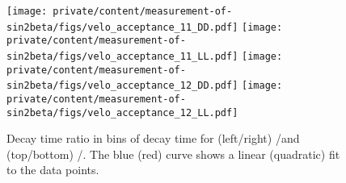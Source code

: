 %
\begin{figure}
  \texttt{[image: private/content/measurement-of-sin2beta/figs/velo\_acceptance\_11\_DD.pdf]}\hfill
  \texttt{[image: private/content/measurement-of-sin2beta/figs/velo\_acceptance\_11\_LL.pdf]}
  \texttt{[image: private/content/measurement-of-sin2beta/figs/velo\_acceptance\_12\_DD.pdf]}\hfill
  \texttt{[image: private/content/measurement-of-sin2beta/figs/velo\_acceptance\_12\_LL.pdf]}
\caption{
Decay time ratio in bins of decay time for (left/right) \catDD/\catLL and
(top/bottom) \catOO/\catOT. The blue (red) curve shows a linear (quadratic) fit
to the data points.}
\label{fig:measurement_of_sin2beta:resolution_and_acceptance:acceptance:upper}
\end{figure}
